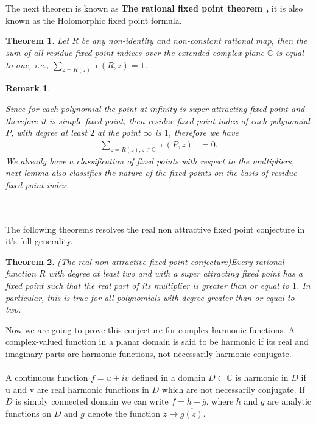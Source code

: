 \documentclass[a4paper,12pt,reqno]{amsart}
\newtheorem{thm}{Theorem}
\newtheorem*{remark}{Remark}
\begin{document}
The next theorem is known as \textbf{The rational fixed point theorem \cite{The real non-attractive fixed point conjecture and beyond},} it is also known as the Holomorphic fixed point formula.
 
\begin{thm}\cite{The real non-attractive fixed point conjecture and beyond} Let $R$ be any non-identity and non-constant rational map, then the sum of all residue fixed point indices over the extended complex plane $\widehat{\mathbb{C}}$ is equal to one, i.e., $\displaystyle\sum _{z=R(z)}\imath(R,{z})=1$.
\end{thm}


\begin{remark}\cite{The real non-attractive fixed point conjecture and beyond}
    
Since for each polynomial the point at infinity is super attracting fixed point and therefore it is simple fixed point, then residue fixed point index of each polynomial $P$, with degree at least $2$ at the point $\infty$ is $1$, therefore we have 
\begin{align*}
\displaystyle\sum _{z=R(z);z\in\mathbb{C}}\imath(P,{z})&=0.
\end{align*}
We already have a classification of fixed points with respect to the multipliers, next lemma also classifies the nature of the fixed points on the basis of residue fixed point index.
\end{remark}
 

 ${}$\\ ${}$\\

The following theorems resolves the real non attractive fixed point conjecture in it's full generality.

\begin{thm}{(The real non-attractive fixed point conjecture)}\cite{The real non-attractive fixed point conjecture and beyond}\label{T1}
Every rational function $R$ with degree at least two and with a super attracting fixed point has a fixed point such that the real part of its multiplier is greater than or equal to $1$. In particular, this is true for all polynomials with degree greater than or equal to two.
\end{thm}
Now we are going to prove this conjecture for complex harmonic functions. A complex-valued function in a planar domain is said to be harmonic if its real and imaginary parts are harmonic functions, not necessarily harmonic conjugate. \\\\
A continuous function $f = u + iv$ defined in a domain $D\subset \mathbb{C}$ is harmonic in $D$ if u and v are real harmonic functions in $D$ which are not necessarily conjugate. If $D$ is simply connected domain we can write $f={h}+\overline{g}$, where $h$ and $g$ are analytic functions on $D$ and $g$ denote the function $z\rightarrow\overline{g(z)}$.
\end{document}
